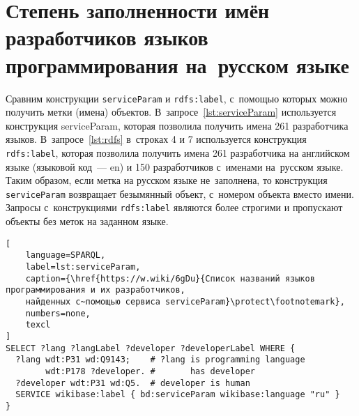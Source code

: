 


\newpage
\section{Степень заполненности имён разработчиков языков программирования на~русском языке}

Сравним конструкции \texttt{serviceParam} и \texttt{rdfs:label}, 
с~помощью которых можно получить метки (имена) объектов. 
%
В~запросе~\ref{lst:serviceParam} используется конструкция serviceParam, 
которая позволила получить имена 261 разработчика языков. 
%
В~запросе~\ref{lst:rdfs} в~строках 4 и 7 используется конструкция \texttt{rdfs:label}, 
которая позволила получить имена 261 разработчика на английском языке (языковой код~--- en) 
и 150 разработчиков с~именами на~русском языке. 
%
Таким образом, если метка на русском языке не~заполнена, 
то конструкция \texttt{serviceParam} возвращает безымянный объект, с~номером объекта вместо имени. 
Запросы с~конструкциями \texttt{rdfs:label} являются более строгими и пропускают 
объекты без меток на заданном языке. 


\begin{lstlisting}[
	language=SPARQL,
	label=lst:serviceParam,
	caption={\href{https://w.wiki/6gDu}{Список названий языков программирования и их разработчиков, 
    найденных с~помощью сервиса serviceParam}\protect\footnotemark},
    numbers=none,
	texcl
]
SELECT ?lang ?langLabel ?developer ?developerLabel WHERE {
  ?lang wdt:P31 wd:Q9143;    # ?lang is programming language
        wdt:P178 ?developer. #       has developer 
  ?developer wdt:P31 wd:Q5.  # developer is human
  SERVICE wikibase:label { bd:serviceParam wikibase:language "ru" }
}
\end{lstlisting}

